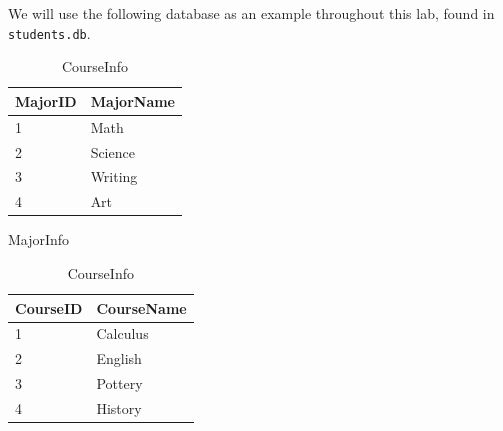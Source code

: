 
We will use the following database as an example throughout this lab, found in \texttt{students.db}.

\begin{table}[H]
\begin{subtable}{0.55\textwidth}
    \centering
    \begin{subtable}{.45\textwidth}
        \centering
        \footnotesize
        \begin{tabular}{|l|l|}
            \hline MajorID & MajorName \\ \hline
            1 & Math \\
            2 & Science \\
            3 & Writing \\
            4 & Art \\ \hline
        \end{tabular}
        \caption{MajorInfo}
        \label{table:sql2-student-majorinfo}
    \end{subtable}
    \hfil
    \begin{subtable}{.45\textwidth}
        \centering
        \footnotesize
        \begin{tabular}{|l|l|}
            \hline CourseID & CourseName \\ \hline
            1 & Calculus \\
            2 & English \\
            3 & Pottery \\
            4 & History \\ \hline
        \end{tabular}
        \caption{CourseInfo}
        \label{table:sql2-student-courseinfo}
    \end{subtable}
    \\[1.em] %
    \begin{subtable}{\textwidth}

\end{subtable}
\end{subtable}
\end{table}
